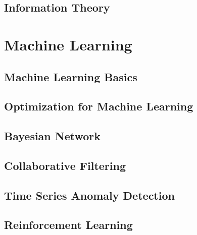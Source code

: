 \documentclass[10pt, twoside]{book}   	%
\begin{document}
\chapter{Information Theory}


\part{Machine Learning}

\chapter{Machine Learning Basics}


\chapter{Optimization for Machine Learning}



\chapter{Bayesian Network}



\chapter{Collaborative Filtering}


\chapter{Time Series Anomaly Detection}


\chapter{Reinforcement Learning}



\iffalse
\appendix
\appendixpage
\addappheadtotoc


\chapter{Amazon Machine Learning University}



\fi
\end{document}
